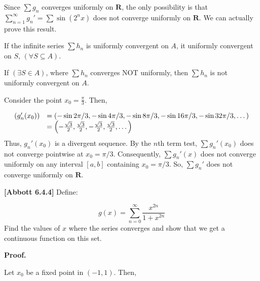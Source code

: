 \documentclass[10pt]{article}
\begin{document}
Since $\displaystyle \sum g_{n}$ converges uniformly on $\displaystyle \mathbf{R}$, the only possibility is that $\displaystyle \sum _{n=1}^{\infty } g_{n} '=\sum \sin\left( 2^{n} x\right)$ does not converge uniformly on $\displaystyle \mathbf{R}$. We can actually prove this result.



If the infinite series $\displaystyle \sum h_{n}$ is uniformly convergent on $\displaystyle A$, it uniformly convergent on $\displaystyle S$, $\displaystyle ( \forall S\subseteq A)$.



If $\displaystyle ( \exists S\in A)$, where $\displaystyle \sum h_{n}$ converges NOT uniformly, then $\displaystyle \sum h_{n}$ is not uniformly convergent on $\displaystyle A$. 



Consider the point $\displaystyle x_{0} =\frac{\pi }{3}$. Then, 


\begin{equation*}
\begin{array}{ c l }
( g_{n} '( x_{0})) & =( -\sin 2\pi /3,-\sin 4\pi /3,-\sin 8\pi /3,-\sin 16\pi /3,-\sin 32\pi /3,\dotsc )\\
 & =\left( -\frac{\sqrt{3}}{2} ,\frac{\sqrt{3}}{2} ,-\frac{\sqrt{3}}{2} ,\frac{\sqrt{3}}{2} ,\dotsc \right)
\end{array}
\end{equation*}
Thus, $\displaystyle g_{n} '( x_{0})$ is a divergent sequence. By the $\displaystyle n$th term test, $\displaystyle \sum g_{n} '( x_{0})$ does not converge pointwise at $\displaystyle x_{0} =\pi /3$. Consequently, $\displaystyle \sum g_{n} '( x)$ does not converge uniformly on any interval $\displaystyle [ a,b]$ containing $\displaystyle x_{0} =\pi /3$. So, $\displaystyle \sum g_{n} '$ does not converge uniformly on $\displaystyle \mathbf{R}$. 



\textbf{[Abbott 6.4.4]} Define:


\begin{equation*}
g( x) =\sum _{n=0}^{\infty }\frac{x^{2n}}{1+x^{2n}}
\end{equation*}
Find the values of $\displaystyle x$ where the series converges and show that we get a continuous function on this set. 



\textbf{Proof.}



Let $\displaystyle x_{0}$ be a fixed point in $\displaystyle ( -1,1)$. Then,
\end{document}
